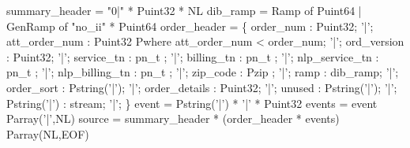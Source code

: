  summary\_header = "0|" * Puint32 * NL
\mbox{}
 dib\_ramp = 
  Ramp of Puint64 
| GenRamp of "no\_ii" * Puint64
\mbox{}
 order\_header = \{
       order\_num      : Puint32;
 '|';  att\_order\_num  : Puint32 Pwhere att\_order\_num < order\_num; 
 '|';  ord\_version    : Puint32;         
 '|';  service\_tn     : pn\_t ;
 '|';  billing\_tn     : pn\_t ;          
 '|';  nlp\_service\_tn : pn\_t ;
 '|';  nlp\_billing\_tn : pn\_t ;
 '|';  zip\_code       : Pzip ;
 '|';  ramp           : dib\_ramp; 
 '|';  order\_sort     : Pstring('|');
 '|';  order\_details  : Puint32;             
 '|';  unused         : Pstring('|');
 '|';  Pstring('|')   : stream;
 '|';
\}
\mbox{}
 event  = Pstring('|') *  '|' * Puint32
\mbox{}
 events = event Parray('|',NL)
\mbox{}
 source = summary\_header * (order\_header * events) Parray(NL,EOF)